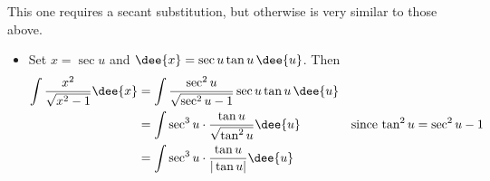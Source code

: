 \begin{eg}\label{eg sec sub}
\soln This one requires a secant substitution, but otherwise is very similar to those
above.
\begin{itemize}
 \item Set $x = \sec u$ and $\dee{x}=\sec u \tan u\, \dee{u}$. Then
\begin{align*}
  \int \frac{x^2}{\sqrt{x^2-1}} \dee{x}
&= \int \frac{\sec^2 u}{\sqrt{\sec^2u-1}} \sec u \tan u\, \dee{u} \\
&= \int \sec^3 u \cdot \frac{ \tan u}{\sqrt{\tan^2u}}  \dee{u}
& \text{since $\tan^2u = \sec^2u-1$} \\
&= \int \sec^3u \cdot \frac{\tan u}{|\tan u|} \dee{u}
\end{align*}

\end{itemize}
\end{eg}
